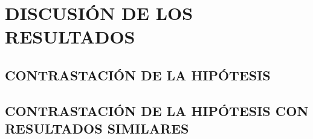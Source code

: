 \chapter{DISCUSIÓN DE LOS RESULTADOS}
\section{CONTRASTACIÓN DE LA HIPÓTESIS}

\lipsum[1]

\section{CONTRASTACIÓN DE LA HIPÓTESIS CON RESULTADOS SIMILARES}

\lipsum[2]
